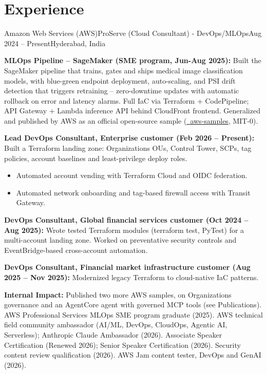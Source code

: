 \section{\textbf{Experience}}
\resumeSubHeadingListStart

\resumeExp
{Amazon Web Services (AWS)}{ProServe (Cloud Consultant) - DevOps/MLOps}{Aug 2024 -- Present}{Hyderabad, India}
\resumeItemListStart
    \item[$\diamond$] \textbf{MLOps Pipeline -- SageMaker (SME program, Jun-Aug 2025):} Built the SageMaker pipeline that trains, gates and ships medical image classification models, with blue-green endpoint deployment, auto-scaling, and PSI drift detection that triggers retraining -- zero-downtime updates with automatic rollback on error and latency alarms. Full IaC via Terraform + CodePipeline; API Gateway + Lambda inference API behind CloudFront frontend. Generalized and published by AWS as an official open-source sample (\href{https://github.com/aws-samples/sample-sagemaker-image-classification-mlops}{\faGithub\ aws-samples}, MIT-0).
    \item[$\diamond$] \textbf{Lead DevOps Consultant, Enterprise customer (Feb 2026 -- Present):} Built a Terraform landing zone: Organizations OUs, Control Tower, SCPs, tag policies, account baselines and least-privilege deploy roles.
    \begin{itemize}[leftmargin=2.5ex, noitemsep, topsep=0pt, labelsep=1.2mm]
        \item[$\circ$] Automated account vending with Terraform Cloud and OIDC federation.
        \item[$\circ$] Automated network onboarding and tag-based firewall access with Transit Gateway.
    \end{itemize}
    \item[$\diamond$] \textbf{DevOps Consultant, Global financial services customer (Oct 2024 -- Aug 2025):} Wrote tested Terraform modules (terraform test, PyTest) for a multi-account landing zone. Worked on preventative security controls and EventBridge-based cross-account automation.
    \item[$\diamond$] \textbf{DevOps Consultant, Financial market infrastructure customer (Aug 2025 -- Nov 2025):} Modernized legacy Terraform to cloud-native IaC patterns.
    \item[$\diamond$] \textbf{Internal Impact:} Published two more AWS samples, on Organizations governance and an AgentCore agent with governed MCP tools (see Publications). AWS Professional Services MLOps SME program graduate (2025). AWS technical field community ambassador (AI/ML, DevOps, CloudOps, Agentic AI, Serverless); Anthropic Claude Ambassador (2026). Associate Speaker Certification (Renewed 2026); Senior Speaker Certification (2026). Security content review qualification (2026). AWS Jam content tester, DevOps and GenAI (2026).
\resumeItemListEnd

